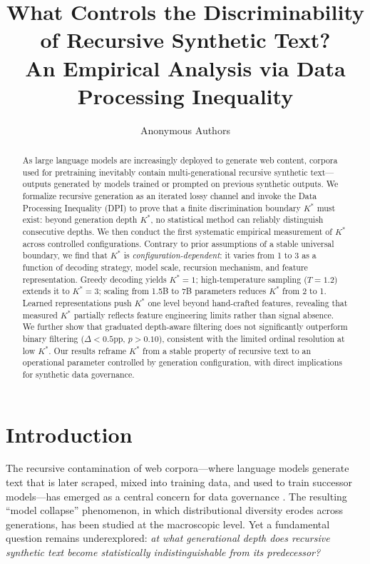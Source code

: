 \documentclass[11pt]{article}
\title{What Controls the Discriminability of Recursive Synthetic Text?\\An Empirical Analysis via Data Processing Inequality}
\author{
Anonymous Authors
}
\date{}
\begin{document}
\maketitle

\begin{abstract}
As large language models are increasingly deployed to generate web content, corpora used for pretraining inevitably contain multi-generational recursive synthetic text---outputs generated by models trained or prompted on previous synthetic outputs. We formalize recursive generation as an iterated lossy channel and invoke the Data Processing Inequality (DPI) to prove that a finite discrimination boundary $K^*$ must exist: beyond generation depth $K^*$, no statistical method can reliably distinguish consecutive depths. We then conduct the first systematic empirical measurement of $K^*$ across controlled configurations. Contrary to prior assumptions of a stable universal boundary, we find that $K^*$ is \emph{configuration-dependent}: it varies from 1 to 3 as a function of decoding strategy, model scale, recursion mechanism, and feature representation. Greedy decoding yields $K^*{=}1$; high-temperature sampling ($T{=}1.2$) extends it to $K^*{=}3$; scaling from 1.5B to 7B parameters reduces $K^*$ from 2 to 1. Learned representations push $K^*$ one level beyond hand-crafted features, revealing that measured $K^*$ partially reflects feature engineering limits rather than signal absence. We further show that graduated depth-aware filtering does not significantly outperform binary filtering ($\Delta{<}0.5$pp, $p{>}0.10$), consistent with the limited ordinal resolution at low $K^*$. Our results reframe $K^*$ from a stable property of recursive text to an operational parameter controlled by generation configuration, with direct implications for synthetic data governance.
\end{abstract}

\section{Introduction}

The recursive contamination of web corpora---where language models generate text that is later scraped, mixed into training data, and used to train successor models---has emerged as a central concern for data governance \citep{shumailov2024collapse,alemohammad2024selfconsuming}. The resulting ``model collapse'' phenomenon, in which distributional diversity erodes across generations, has been studied at the macroscopic level. Yet a fundamental question remains underexplored: \emph{at what generational depth does recursive synthetic text become statistically indistinguishable from its predecessor?}
\end{document}
